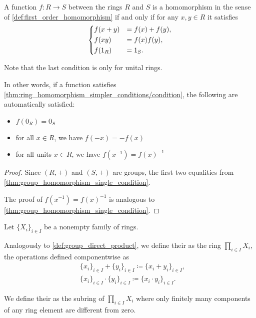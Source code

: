 \begin{proposition}\label{thm:ring_homomorphism_simpler_conditions}
  A function \( f: R \to S \) between the rings \( R \) and \( S \) is a homomorphism in the sense of \cref{def:first_order_homomorphism} if and only if for any \( x, y \in R \) it satisfies
  \begin{equation}\label{thm:ring_homomorphism_simpler_conditions/condition}
    \begin{dcases}
      f(x + y) &= f(x) + f(y), \\
      f(xy) &= f(x) f(y), \\
      f(1_R) &= 1_S.
    \end{dcases}
  \end{equation}

  Note that the last condition is only for unital rings.

  In other words, if a function satisfies \cref{thm:ring_homomorphism_simpler_conditions/condition}, the following are automatically satisfied:
  \begin{itemize}
    \item \( f(0_R) = 0_S \)
    \item for all \( x \in R \), we have \( f(-x) = -f(x) \)
    \item for all units \( x \in R \), we have \( f(x^{-1}) = f(x)^{-1} \)
  \end{itemize}
\end{proposition}
\begin{proof}
  Since \( (R, +) \) and \( (S, +) \) are groups, the first two equalities from \cref{thm:group_homomorphism_single_condition}.

  The proof of \( f(x^{-1}) = f(x)^{-1} \) is analogous to \cref{thm:group_homomorphism_single_condition}.
\end{proof}

\begin{definition}\label{def:semiring_direct_product}
  Let \( \{ X_i \}_{i \in I} \) be a nonempty family of rings.

  Analogously to \cref{def:group_direct_product}, we define their  as the ring \( \prod_{i \in I} X_i \), the operations defined componentwise as
  \begin{align*}
    &\{ x_i \}_{i \in I} + \{ y_i \}_{i \in I}
    \coloneqq
    \{ x_i + y_i \}_{i \in I}, \\
    &\{ x_i \}_{i \in I} \cdot \{ y_i \}_{i \in I}
    \coloneqq
    \{ x_i \cdot y_i \}_{i \in I}.
  \end{align*}

  We define their  as the subring of \( \prod_{i \in I} X_i \) where only finitely many components of any ring element are different from zero.
\end{definition}

